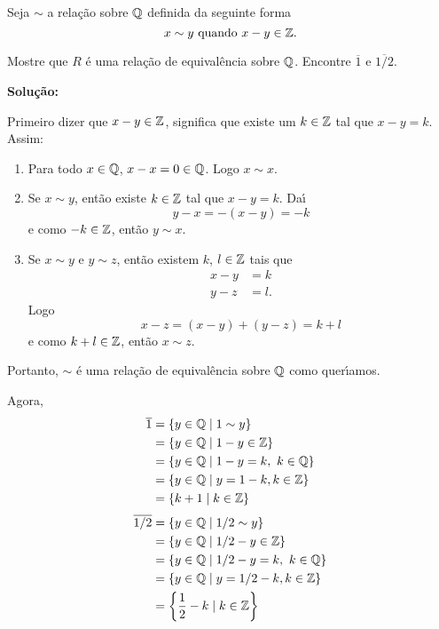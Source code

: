 \documentclass[12pt]{exam}
\begin{document}
\vspace{.5cm}

\questao Seja $\sim$ a rela\c{c}\~ao sobre $\mathbb{Q}$ definida da seguinte forma
\[
	x\sim y \mbox{ quando } x - y \in \mathbb{Z}.
\]

Mostre que $R$ \'e uma rela{\c c}{\~a}o de equival{\^e}ncia sobre $\mathbb{Q}$. Encontre $\overline{1}$ e $\overline{1/2}$.


\noindent\textbf{Solu\c{c}\~ao:}

Primeiro dizer que $x - y \in \mathbb{Z}$, significa que existe um $k \in \mathbb{Z}$ tal que $x - y = k$. Assim:
\begin{enumerate}[label={\roman*})]
	\item Para todo $x \in \mathbb{Q}$, $x - x = 0 \in \mathbb{Q}$. Logo $x \sim x$.
	\item Se $x \sim y$, ent\~ao existe $k \in \mathbb{Z}$ tal que $x - y = k$. Da{\'\i}
	\[
		y - x = -(x - y) = -k
	\]
	e como $-k \in \mathbb{Z}$, ent\~ao $y \sim x$.
	\item Se $x \sim y$ e $y \sim z$, ent\~ao existem $k$, $l \in \mathbb{Z}$ tais que
	\begin{align*}
		x - y &= k\\
		y - z &= l.
	\end{align*}
	Logo
	\[
		x - z = (x - y) + (y - z) = k + l
	\]
	e como $k + l \in \mathbb{Z}$, ent\~ao $x \sim z$.
\end{enumerate}

Portanto, $\sim$ \'e uma rela\c{c}\~ao de equival\^encia sobre $\mathbb{Q}$ como quer{\'\i}amos.

Agora,
\begin{align*}
	\overline{1} &= \{y \in \mathbb{Q} \mid 1 \sim y\} \\&= \{y \in \mathbb{Q} \mid 1 - y \in \mathbb{Z}\} \\&= \{y \in \mathbb{Q} \mid 1 - y = k,\ k \in \mathbb{Q}\}\\&= \{y \in \mathbb{Q} \mid y = 1 - k, k \in \mathbb{Z}\} \\&= \{k + 1 \mid k \in \mathbb{Z}\}
\end{align*}
\begin{align*}
	\overline{1/2} &= \{y \in \rac \mid 1/2 \sim y\} \\&= \{y \in \rac \mid 1/2 - y \in \z\} \\&= \{y \in \rac \mid 1/2 - y = k,\ k \in \rac\} \\&= \{y \in \rac \mid y = 1/2 - k, k \in \z\} \\&= \left\{\dfrac{1}{2} - k \mid k \in \z\right\}
\end{align*}
\end{document}
